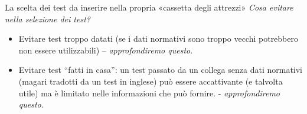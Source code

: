 \documentclass[
  ignorenonframetext,
]{beamer}
\begin{document}
\begin{frame}{La scelta dei test da inserire nella propria «cassetta
degli attrezzi»}
\label{la-scelta-dei-test-da-inserire-nella-propria-cassetta-degli-attrezzi-4}
\emph{Cosa evitare nella selezione dei test?}

\begin{itemize}[<*>] 
  \item Evitare test troppo datati (se i dati normativi sono troppo vecchi potrebbero non essere utilizzabili) –     \emph{approfondiremo questo}.
  \item Evitare test “fatti in casa”: un test passato da un collega senza dati normativi (magari tradotti da un test in inglese) può essere accattivante (e talvolta utile) ma è limitato nelle informazioni che può fornire. - \emph{approfondiremo questo}.
\end{itemize}
\end{frame}
\end{document}
